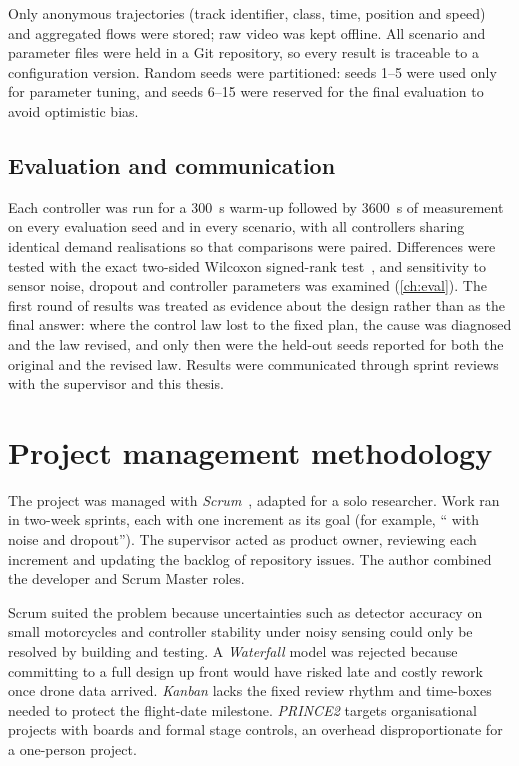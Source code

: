 Only anonymous trajectories (track identifier, class, time, position and speed) and aggregated flows were stored; raw video was kept offline. All scenario and parameter files were held in a Git repository, so every result is traceable to a configuration version. Random seeds were partitioned: seeds 1--5 were used only for parameter tuning, and seeds 6--15 were reserved for the final evaluation to avoid optimistic bias.

\subsection{Evaluation and communication}
Each controller was run for a 300~s warm-up followed by 3600~s of measurement on every evaluation seed and in every scenario, with all controllers sharing identical demand realisations so that comparisons were paired. Differences were tested with the exact two-sided Wilcoxon signed-rank test~\cite{wilcoxon1945}, and sensitivity to sensor noise, dropout and controller parameters was examined (\cref{ch:eval}). The first round of results was treated as evidence about the design rather than as the final answer: where the control law lost to the fixed plan, the cause was diagnosed and the law revised, and only then were the held-out seeds reported for both the original and the revised law. Results were communicated through sprint reviews with the supervisor and this thesis.

\section{Project management methodology}\label{sec:method-pm}

The project was managed with \emph{Scrum}~\cite{schwaber2020scrum}, adapted for a solo researcher. Work ran in two-week sprints, each with one increment as its goal (for example, ``\vls{} with noise and dropout''). The supervisor acted as product owner, reviewing each increment and updating the backlog of repository issues. The author combined the developer and Scrum Master roles.

Scrum suited the problem because uncertainties such as detector accuracy on small motorcycles and controller stability under noisy sensing could only be resolved by building and testing. A \emph{Waterfall} model was rejected because committing to a full design up front would have risked late and costly rework once drone data arrived. \emph{Kanban} lacks the fixed review rhythm and time-boxes needed to protect the flight-date milestone. \emph{PRINCE2} targets organisational projects with boards and formal stage controls, an overhead disproportionate for a one-person project.


